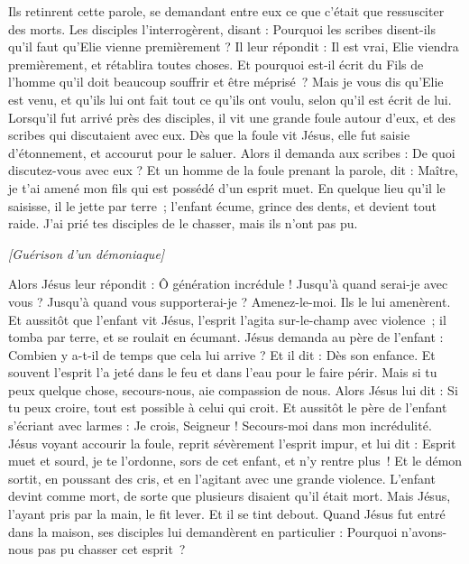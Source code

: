 \begin{multicols}{2}
Ils retinrent cette parole, se demandant entre eux ce que c'était que ressusciter des morts.
Les disciples l'interrogèrent, disant : Pourquoi les scribes disent-ils qu'il faut qu'Elie vienne premièrement ?
Il leur répondit : Il est vrai, Elie viendra premièrement, et rétablira toutes choses. Et pourquoi est-il écrit du Fils de l'homme qu’il doit beaucoup souffrir et être méprisé ?
Mais je vous dis qu’Elie est venu, et qu'ils lui ont fait tout ce qu’ils ont voulu, selon qu’il est écrit de lui.
Lorsqu’il fut arrivé près des disciples, il vit une grande foule autour d’eux, et des scribes qui discutaient avec eux.
Dès que la foule vit Jésus, elle fut saisie d'étonnement, et accourut pour le saluer.
Alors il demanda aux scribes : De quoi discutez-vous avec eux ?
Et un homme de la foule prenant la parole, dit : Maître, je t'ai amené mon fils qui est possédé d’un esprit muet.
En quelque lieu qu’il le saisisse, il le jette par terre ; l’enfant écume, grince des dents, et devient tout raide. J’ai prié tes disciples de le chasser, mais ils n'ont pas pu.
\begin{center}
\textit{[Guérison d'un démoniaque]}
\end{center}
\PPE{}
Alors Jésus leur répondit : Ô génération incrédule ! Jusqu’à quand serai-je avec vous ? Jusqu’à quand vous supporterai-je ? Amenez-le-moi. Ils le lui amenèrent.
Et aussitôt que l’enfant vit Jésus, l'esprit l'agita sur-le-champ avec violence ; il tomba par terre, et se roulait en écumant.
Jésus demanda au père de l'enfant : Combien y a-t-il de temps que cela lui arrive ? Et il dit : Dès son enfance.
Et souvent l’esprit l’a jeté dans le feu et dans l'eau pour le faire périr. Mais si tu peux quelque chose, secours-nous, aie compassion de nous.
Alors Jésus lui dit : Si tu peux croire, tout est possible à celui qui croit.
Et aussitôt le père de l'enfant s'écriant avec larmes : Je crois, Seigneur ! Secours-moi dans mon incrédulité.
Jésus voyant accourir la foule, reprit sévèrement l’esprit impur, et lui dit : Esprit muet et sourd, je te l’ordonne, sors de cet enfant, et n'y rentre plus !
Et le démon sortit, en poussant des cris, et en l’agitant avec une grande violence. L’enfant devint comme mort, de sorte que plusieurs disaient qu’il était mort.
Mais Jésus, l'ayant pris par la main, le fit lever. Et il se tint debout.
Quand Jésus fut entré dans la maison, ses disciples lui demandèrent en particulier : Pourquoi n’avons-nous pas pu chasser cet esprit ?

\end{multicols}
